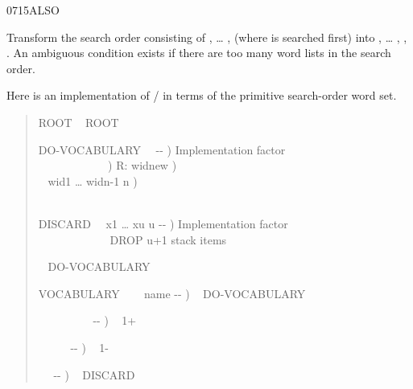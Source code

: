 \begin{worddef}{0715}{ALSO}
\item \stack{}{}

	Transform the search order consisting of , {\ldots}
	,  (where  is searched
	first) into , {\ldots} , ,
	. An ambiguous condition exists if there are too
	many word lists in the search order.

	\begin{defer}
	\rationale %
		Here is an implementation of / in terms
		of the primitive search-order word set.
		\begin{quote}\ttfamily
		  ROOT ~
		ROOT 

		\word{:} DO-VOCABULARY~~ -{}- )
			 Implementation factor \\
		\tab{}~~ 
				~~~~~~~~~\word{p} )  R: widnew ) \\
		\tab~  
				 wid1 {\ldots} widn-1 n ) \\
		\tab~   \\
		\word{;}

		\word{:} DISCARD~~ x1 {\ldots} xu u -{}- )
			 Implementation factor \\
		   
			~~~~~~~~~~~~ DROP u+1 stack items \\
		\word{;}

		  ~
		 \word{,} DO-VOCABULARY

		\word{:} VOCABULARY ~~~ name -{}- )
			  \word{,} ~ DO-VOCABULARY
		\word{;}

		\word{:}  ~~~~~~~~~ -{}- )
			 ~ 
			 1+ 
		\word{;}

		\word{:}  ~~~~~ -{}- )
			 ~ 
			 1- 
		\word{;}

		\word{:}  ~~ -{}- )
			 ~ 
			 DISCARD
		\word{;}


\end{quote}
\end{defer}
\end{worddef}

